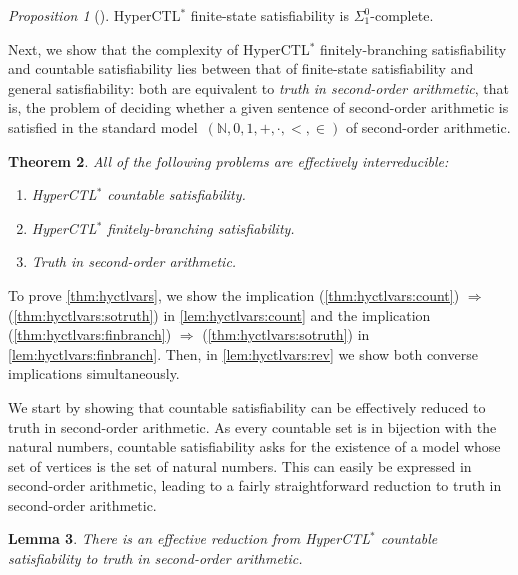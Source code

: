 \documentclass[dvipsnames,10pt,a4paper]{amsart}
\newtheorem{thm}{Theorem}[section]
\newtheorem{lem}[thm]{Lemma}
\theoremstyle{definition}
\theoremstyle{remark}
\newtheorem{propC}[thm]{Proposition}
\newcommand{\nats}{\mathbb{N}}
\newcommand{\hyctlstar}{{HyperCTL$^*$}\xspace}
\begin{document}
\begin{propC}[\cite{FinkbeinerRS15,FinkbeinerH16}]
\hyctlstar finite-state satisfiability is $\Sigma_1^0$-complete.
\end{propC}

Next, we show that the complexity of \hyctlstar finitely-branching satisfiability
and countable satisfiability lies between that of finite-state satisfiability
and general satisfiability:
both are equivalent to \emph{truth in second-order arithmetic}, that is,
the problem of deciding whether a given sentence of second-order arithmetic is satisfied
in the standard model~$(\nats, 0,1,+,\cdot, <,\in)$ of second-order arithmetic.

\begin{thm}\label{thm:hyctlvars}
All of the following problems are effectively interreducible:
  \begin{enumerate}
  \item\label{thm:hyctlvars:count} \hyctlstar countable satisfiability.
  \item\label{thm:hyctlvars:finbranch} \hyctlstar finitely-branching satisfiability.
  \item\label{thm:hyctlvars:sotruth} Truth in second-order arithmetic.
  \end{enumerate}
\end{thm}

To prove \autoref{thm:hyctlvars}, we show the implication (\ref{thm:hyctlvars:count}) $\Rightarrow$ (\ref{thm:hyctlvars:sotruth}) in \autoref{lem:hyctlvars:count} and the  implication (\ref{thm:hyctlvars:finbranch}) $\Rightarrow$ (\ref{thm:hyctlvars:sotruth}) in \autoref{lem:hyctlvars:finbranch}.
Then, in \autoref{lem:hyctlvars:rev} we show both converse implications simultaneously. 

We start by showing that countable satisfiability can be effectively reduced to truth in second-order arithmetic.
As every countable set is in bijection with the natural numbers, countable satisfiability asks for the existence of a model whose set of vertices is the set of natural numbers. 
This can easily be expressed in second-order arithmetic, leading to a fairly
straightforward reduction to truth in second-order arithmetic.

\begin{lem}\label{lem:hyctlvars:count}
There is an effective reduction from \hyctlstar countable
  satisfiability to truth in second-order arithmetic.
\end{lem}
\end{document}
